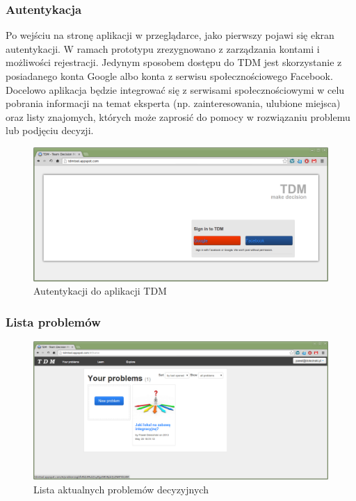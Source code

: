 \subsubsection{Autentykacja}
Po wejściu na stronę aplikacji w przeglądarce, jako pierwszy pojawi się ekran
autentykacji. W ramach prototypu zrezygnowano z zarządzania kontami i możliwości
rejestracji. Jedynym sposobem dostępu do TDM jest skorzystanie z posiadanego
konta Google albo konta z serwisu społecznościowego Facebook. Docelowo aplikacja
będzie integrować się z serwisami społecznościowymi w celu pobrania informacji
na temat eksperta (np. zainteresowania, ulubione miejsca) oraz listy znajomych,
których może zaprosić do pomocy w rozwiązaniu problemu lub podjęciu decyzji.
\begin{figure}[!htbp]
  \includegraphics[width=\linewidth]
    {chapters/prototyp/tdm_authentication}
  \caption{Autentykacji do aplikacji TDM}
  \label{fig:authentication}
\end{figure}

\subsubsection{Lista problemów}
\begin{figure}[!htbp]
  \includegraphics[width=\linewidth]
    {chapters/prototyp/tdm_problem_list}
  \caption{Lista aktualnych problemów decyzyjnych}
  \label{fig:problem_list}
\end{figure}

